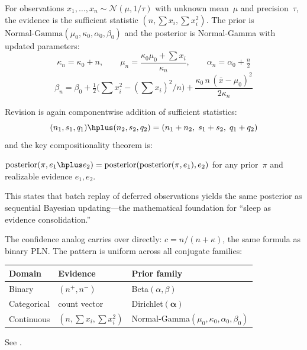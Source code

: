 \documentclass[11pt,openany]{report}
\begin{document}
For observations $x_1, \ldots, x_n \sim \mathcal{N}(\mu, 1/\tau)$
with unknown mean~$\mu$ and precision~$\tau$, the evidence is the
sufficient statistic $(n, \textstyle\sum x_i, \sum x_i^2)$.  The prior
is $\text{Normal-Gamma}(\mu_0, \kappa_0, \alpha_0, \beta_0)$ and the
posterior is Normal-Gamma with updated parameters:
\[
  \kappa_n = \kappa_0 + n, \qquad
  \mu_n = \frac{\kappa_0 \mu_0 + \sum x_i}{\kappa_n}, \qquad
  \alpha_n = \alpha_0 + \tfrac{n}{2}
\]
\[
  \beta_n = \beta_0
    + \tfrac{1}{2}\bigl(\textstyle\sum x_i^2 - (\sum x_i)^2/n\bigr)
    + \frac{\kappa_0 \, n \, (\bar{x} - \mu_0)^2}{2\kappa_n}
\]

Revision is again componentwise addition of sufficient statistics:
\[
  (n_1, s_1, q_1) \hplus (n_2, s_2, q_2) = (n_1 + n_2,\; s_1 + s_2,\; q_1 + q_2)
\]
and the key compositionality theorem is:
\begin{theorem}
\label{thm:sleep-consolidation}
  $\text{posterior}(\pi, e_1 \hplus e_2)
   = \text{posterior}(\text{posterior}(\pi, e_1), e_2)$
  for any prior~$\pi$ and realizable evidence $e_1, e_2$.
\end{theorem}
This states that batch replay of deferred observations yields the same
posterior as sequential Bayesian updating---the mathematical foundation
for ``sleep as evidence consolidation.''

The confidence analog carries over directly: $c = n/(n + \kappa)$,
the same formula as binary PLN.  The pattern is uniform across all
conjugate families:

\medskip
\begin{center}
\begin{tabular}{lll}
  \textbf{Domain} & \textbf{Evidence} & \textbf{Prior family} \\
  \hline
  Binary  & $(n^+, n^-)$ & Beta$(\alpha, \beta)$ \\
  Categorical & count vector & Dirichlet$(\boldsymbol\alpha)$ \\
  Continuous  & $(n, \sum x_i, \sum x_i^2)$ & Normal-Gamma$(\mu_0, \kappa_0, \alpha_0, \beta_0)$
\end{tabular}
\end{center}
\medskip

See .
\end{document}
